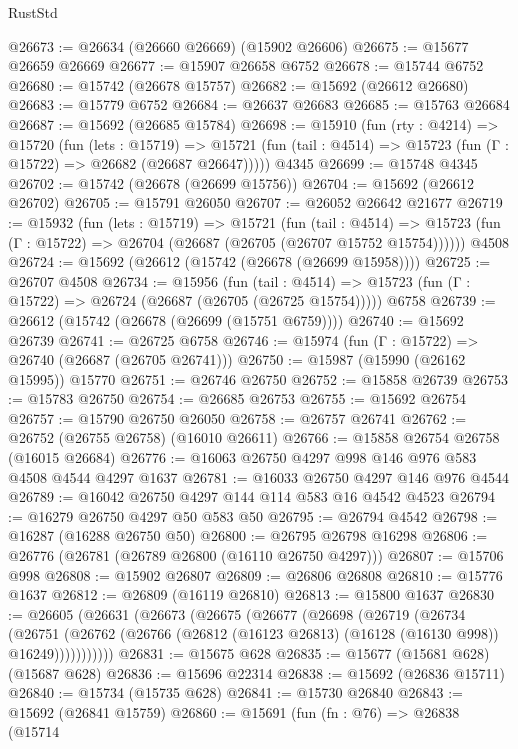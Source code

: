 \begin{lexlean}{RustStd}
\begin{coremodule}
@26673 := @26634 (@26660 @26669) (@15902 @26606)
@26675 := @15677 @26659 @26669
@26677 := @15907 @26658 @6752
@26678 := @15744 @6752
@26680 := @15742 (@26678 @15757)
@26682 := @15692 (@26612 @26680)
@26683 := @15779 @6752
@26684 := @26637 @26683
@26685 := @15763 @26684
@26687 := @15692 (@26685 @15784)
@26698 := @15910
    (fun (rty : @4214) =>
    @15720
      (fun (lets : @15719) =>
      @15721 (fun (tail : @4514) => @15723 (fun (Γ : @15722) => @26682 (@26687 @26647)))))
    @4345
@26699 := @15748 @4345
@26702 := @15742 (@26678 (@26699 @15756))
@26704 := @15692 (@26612 @26702)
@26705 := @15791 @26050
@26707 := @26052 @26642 @21677
@26719 := @15932
    (fun (lets : @15719) =>
    @15721
      (fun (tail : @4514) =>
      @15723 (fun (Γ : @15722) => @26704 (@26687 (@26705 (@26707 @15752 @15754))))))
    @4508
@26724 := @15692 (@26612 (@15742 (@26678 (@26699 @15958))))
@26725 := @26707 @4508
@26734 := @15956
    (fun (tail : @4514) => @15723 (fun (Γ : @15722) => @26724 (@26687 (@26705 (@26725 @15754)))))
    @6758
@26739 := @26612 (@15742 (@26678 (@26699 (@15751 @6759))))
@26740 := @15692 @26739
@26741 := @26725 @6758
@26746 := @15974 (fun (Γ : @15722) => @26740 (@26687 (@26705 @26741)))
@26750 := @15987 (@15990 (@26162 @15995)) @15770
@26751 := @26746 @26750
@26752 := @15858 @26739
@26753 := @15783 @26750
@26754 := @26685 @26753
@26755 := @15692 @26754
@26757 := @15790 @26750 @26050
@26758 := @26757 @26741
@26762 := @26752 (@26755 @26758) (@16010 @26611)
@26766 := @15858 @26754 @26758 (@16015 @26684)
@26776 := @16063 @26750 @4297 @998 @146 @976 @583 @4508 @4544 @4297 @1637
@26781 := @16033 @26750 @4297 @146 @976 @4544
@26789 := @16042 @26750 @4297 @144 @114 @583 @16 @4542 @4523
@26794 := @16279 @26750 @4297 @50 @583 @50
@26795 := @26794 @4542
@26798 := @16287 (@16288 @26750 @50)
@26800 := @26795 @26798 @16298
@26806 := @26776 (@26781 (@26789 @26800 (@16110 @26750 @4297)))
@26807 := @15706 @998
@26808 := @15902 @26807
@26809 := @26806 @26808
@26810 := @15776 @1637
@26812 := @26809 (@16119 @26810)
@26813 := @15800 @1637
@26830 := @26605
    (@26631
      (@26673
        (@26675
          (@26677
            (@26698
              (@26719
                (@26734
                  (@26751
                    (@26762 (@26766 (@26812 (@16123 @26813) (@16128 (@16130 @998)) @16249)))))))))))
@26831 := @15675 @628
@26835 := @15677 (@15681 @628) (@15687 @628)
@26836 := @15696 @22314
@26838 := @15692 (@26836 @15711)
@26840 := @15734 (@15735 @628)
@26841 := @15730 @26840
@26843 := @15692 (@26841 @15759)
@26860 := @15691
    (fun (fn : @76) =>
    @26838
      (@15714

\end{coremodule}
\end{lexlean}
